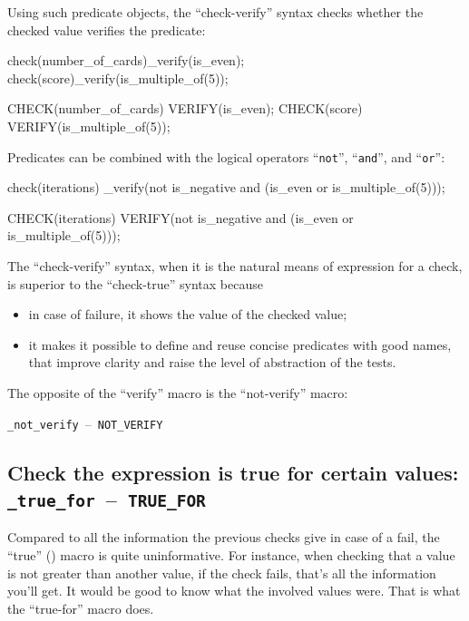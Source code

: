 \documentclass[twoside, a4paper, article]{memoir}
\newcommand*\testudocolor{\color{red!80!blue}}
\newcommand*\testudo[1]{\texttt{\testudocolor{}#1}}
\newcommand*\testudopair[2]{\testudo{#1}~--~\testudo{#2}}
\newcommand\subsectiontestudopair[3]{%
  \subsection[#1]{#1: \testudopair{#2}{#3}}}
\begin{document}
Using such predicate objects, the ``check-verify'' syntax checks whether the
checked value verifies the predicate:
\begin{cpplisting}
check(number_of_cards)_verify(is_even);
check(score)_verify(is_multiple_of(5));
\end{cpplisting}

\begin{cpplisting}
CHECK(number_of_cards) VERIFY(is_even);
CHECK(score) VERIFY(is_multiple_of(5));
\end{cpplisting}

Predicates can be combined with the logical operators ``\texttt{not}'',
``\texttt{and}'', and ``\texttt{or}'':
\begin{cpplisting}
check(iterations)
  _verify(not is_negative
          and (is_even or is_multiple_of(5)));
\end{cpplisting}

\begin{cpplisting}
CHECK(iterations)
  VERIFY(not is_negative
         and (is_even or is_multiple_of(5)));
\end{cpplisting}

The ``check-verify'' syntax, when it is the natural means of expression for a
check, is superior to the ``check-true'' syntax because
\begin{itemize}
\item in case of failure, it shows the value of the checked value;
\item it makes it possible to define and reuse concise predicates with good
  names, that improve clarity and raise the level of abstraction of the tests.
\end{itemize}

The opposite of the ``verify'' macro is the ``not-verify'' macro:
\begin{center}
  \testudopair{\_not\_verify}{NOT\_VERIFY}
\end{center}

\subsectiontestudopair{Check the expression is true for certain values}%
{\_true\_for}{TRUE\_FOR}
\label{sec:check-expression-true-for}

Compared to all the information the previous checks give in case of a fail, the
``true'' () macro is quite uninformative.  For
instance, when checking that a value is not greater than another value, if the
check fails, that's all the information you'll get.  It would be good to know
what the involved values were.  That is what the ``true-for'' macro does.
\end{document}
